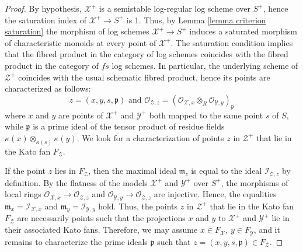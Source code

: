 \documentclass{amsart}%
\numberwithin{equation}{subsection}
\theoremstyle{plain2}
\theoremstyle{definition2}
\theoremstyle{stepstyle}
\theoremstyle{point}
\theoremstyle{subpoint}
\newcommand{\cX}{\ensuremath{\mathscr{X}}}
\newcommand{\fp}{\ensuremath{\mathfrak{p}}}
\newcommand{\caO}{\ensuremath{\mathcal{O}}}
\newcommand{\caI}{\ensuremath{\mathcal{I}}}
\newcommand{\cY}{\ensuremath{\mathscr{Y}}}
\newcommand{\cZ}{\ensuremath{\mathscr{Z}}}
\renewcommand{\cZ}{\ensuremath{\mathscr{Z}}}
\renewcommand{\cY}{\ensuremath{\mathscr{Y}}}
\begin{document}
\begin{proof}
By hypothesis, $\cX^+$ is a semistable log-regular log scheme over $S^+$, hence the saturation index of $\cX^+ \rightarrow S^+$ is 1. Thus, by Lemma \ref{lemma criterion saturation} the morphism of log schemes $\cX^+ \rightarrow S^+$ induces a saturated morphism of characteristic monoids at every point of $\cX^+$. The saturation condition implies that the fibred product in the category of log schemes coincides with the fibred product in the category of $fs$ log schemes. In particular, the underlying scheme of $\cZ^+$ coincides with the usual schematic fibred product, hence its points are characterized as follows:$$z=(x,y,s,\fp) \text{ and } \caO_{\cZ,z}=(\caO_{\cX,x} \otimes_R \caO_{\cY,y})_{\fp}$$ where $x$ and $y$ are points of $\cX^+$ and $\cY^+$ both mapped to the same point $s$ of $S$, while $\fp$ is a prime ideal of the tensor product of residue fields $\kappa(x) \otimes_{\kappa(s)} \kappa(y)$. We look for a characterization of points $z$ in $\cZ^+$ that lie in the Kato fan $F_{\cZ}$.

If the point $z$ lies in $F_{\cZ}$, then the maximal ideal $\mathfrak{m}_z$ is equal to the ideal $\caI_{\cZ,z}$ by definition. By the flatness of the models $\cX^+$ and $\cY^+$ over $S^+$, the morphisms of local rings $\caO_{\cX,x} \rightarrow \caO_{\cZ,z}$ and $\caO_{\cY,y} \rightarrow \caO_{\cZ,z}$ are injective. Hence, the equalities $\mathfrak{m}_x= \caI_{\cX,x}$ and $\mathfrak{m}_y= \caI_{\cY,y}$ hold. Thus, the points $z$ in $\cZ^+$ that lie in the Kato fan $F_{\cZ}$ are necessarily points such that the projections $x$ and $y$ to $\cX^+$ and $\cY^+$ lie in their associated Kato fans. Therefore, we may assume $x \in F_{\cX}$, $y \in F_{\cY}$, and it remains to characterize the prime ideals $\fp$ such that $z=(x,y,s,\fp) \in F_{\cZ}$.


\end{proof}
\end{document}
